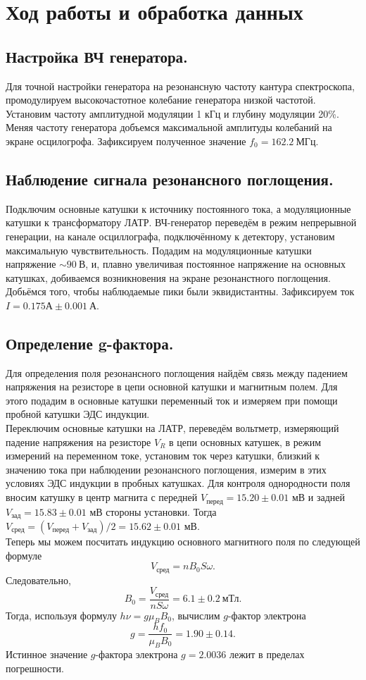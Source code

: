 \documentclass[a4paper,12pt]{article}
\begin{document}
\section*{Ход работы и обработка данных}
\subsection*{Настройка ВЧ генератора.}
Для точной настройки генератора на резонансную частоту кантура спектроскопа, промодулируем высокочастотное колебание генератора низкой частотой. Установим частоту амплитудной модуляции 1 кГц и глубину модуляции 20\%. Меняя частоту генератора добъемся максимальной амплитуды колебаний на экране осцилогрофа. Зафиксируем полученное значение $f_0 = 162.2~\text{МГц}$.
\subsection*{Наблюдение сигнала резонансного поглощения.}
Подключим основные катушки к источнику постоянного тока, а модуляционные катушки к трансформатору ЛАТР. ВЧ-генератор переведём в режим непрерывной генерации, на канале осциллографа, подключённому к детектору, установим максимальную чувствительность. Подадим на модуляционные катушки напряжение $\sim 90~\text{В}$, и, плавно увеличивая постоянное напряжение на основных катушках, добиваемся возникновения на экране резонанстного поглощения. Добьёмся того, чтобы наблюдаемые пики были эквидистантны. Зафиксируем ток $I = 0.175 А \pm 0.001~\text{А}$.
\subsection*{Определение g-фактора.}
Для определения поля резонансного поглощения найдём связь между падением напряжения на резисторе в цепи основной катушки и магнитным полем. Для этого подадим в основные катушки переменный ток и измеряем при помощи пробной катушки
ЭДС индукции. \\
Переключим основные катушки на ЛАТР, переведём вольтметр, измеряющий
падение напряжения на резисторе $V_R$ в цепи основных катушек, в режим измерений на
переменном токе, установим ток через катушки, близкий к значению тока при наблюдении резонансного поглощения, измерим в этих условиях ЭДС индукции в пробных катушках. Для контроля однородности поля вносим катушку в центр магнита с передней $V_{\text{перед}} = 15.20 \pm 0.01 \text{ мВ}$ и задней $V_{\text{зад}} = 15.83 \pm 0.01 \text{ мВ}$
стороны установки. Тогда $V_{\text{сред}} = \left( V_{\text{перед}} + V_{\text{зад}}\right)/2 = 15.62 \pm 0.01 \text{ мВ}$. \\
Теперь мы можем посчитать индукцию основного магнитного поля по следующей формуле
\[V_{\text{сред}} = nB_0S\omega.\]
Следовательно,
\[B_0 = \dfrac{V_{\text{сред}}}{nS\omega} = 6.1 \pm 0.2~\text{мТл}.\]
Тогда, используя формулу $h \nu = g\mu_B B_{0}$, вычислим $g$-фактор электрона
\[g = \dfrac{hf_0}{\mu_B B_0} = 1.90 \pm 0.14.\]
Истинное значение $g$-фактора электрона $g = 2.0036$ лежит в пределах погрешности.
\end{document}
